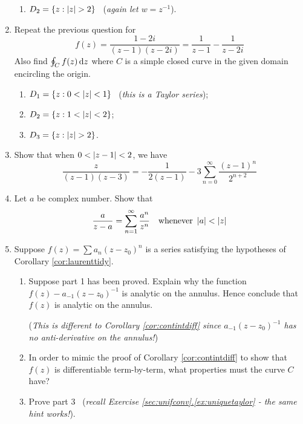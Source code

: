 \begin{exercises*}
\begin{enumerate}
\begin{enumerate}
		\item $D_2=\{z:\nm z>2\}$ \ (\emph{again let $w=z^{-1}$}).
	\end{enumerate}
	
	\item Repeat the previous question for
  \[f(z)=\frac{1-2i}{(z-1)(z-2i)}=\frac 1{z-1}-\frac 1{z-2i}\]
  Also find $\oint_Cf(z)\,{\mathrm{d} z}$ where $C$ is a simple closed curve in the given domain encircling the origin.
  \begin{enumerate}
    \item $D_1=\{z:0<\left| z\right|<1\}$ \ (\emph{this is a Taylor series});
    
    \item $D_2=\{z:1<\left| z\right|<2\}$;
		
		\item $D_3=\{z:\nm z>2\}$.
	\end{enumerate}

	\item Show that when $0<\left| z-1\right|<2$,  we have
	\[\frac z{(z-1)(z-3)}=-\frac 1{2(z-1)}-3\sum_{n=0}^\infty\frac{(z-1)^n}{2^{n+2}}\]
	
	\item Let $a$ be complex number. Show that
	\[\frac a{z-a}=\sum_{n=1}^\infty\frac{a^n}{z^n}\quad\text{whenever }\left| a\right|<\left| z\right|\]
	
  \item Suppose $f(z)=\sum a_n(z-z_0)^n$ is a series satisfying the hypotheses of Corollary \ref{cor:laurenttidy}.
  \begin{enumerate}
    \item Suppose part 1 has been proved. Explain why the function $f(z)-a_{-1}(z-z_0)^{-1}$ is analytic on the annulus. Hence conclude that $f(z)$ is analytic on the annulus.\par
    (\emph{This is different to Corollary \ref{cor:contintdiff} since $a_{-1}(z-z_0)^{-1}$ has no anti-derivative on the annulus!})
    \item In order to mimic the proof of Corollary \ref{cor:contintdiff} to show that $f(z)$ is differentiable term-by-term, what properties must the curve $C$ have?
    \item Prove part 3 \ (\emph{recall Exercise \hyperref[ex:uniquetaylor]{\ref*{sec:unifconv}.\ref*{ex:uniquetaylor}} - the same hint works!}).
	\end{enumerate}
\end{enumerate}
\end{exercises*}